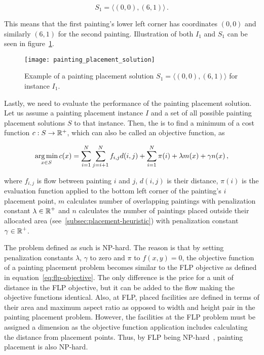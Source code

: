 \[
    S_1 = \langle (0,0), (6,1) \rangle \,.
\]

This means that the first painting's lower left corner has coordinates $(0,0)$
and similarly $(6,1)$ for the second painting.
Illustration of both $I_1$ and $S_1$ can be seen in figure~\ref{fig:painting-placement-solution}.

\begin{figure}
    \texttt{[image: painting\_placement\_solution]}
    \caption[Example of a painting placement solution]{Example of a painting placement solution $S_1 = \langle (0,0), (6,1) \rangle$ for instance $I_1$.}
    \label{fig:painting-placement-solution}
\end{figure}

\newpage

Lastly, we need to evaluate the performance of the painting placement solution.
Let us assume a painting placement instance $I$ and a set of all possible painting placement solutions $S$ to that instance.
Then, the  is to find a minimum of a cost function $c: S \to \operatorname*{\mathbb{R}^+}$,
which can also be called an objective function, as


\begin{equation}
    \operatorname*{arg\,min}_{x \in S} c(x) = \sum\limits_{i=1}^N\sum\limits_{j=i+1}^N f_{i,j}d(i, j) + \sum\limits_{i=1}^N \pi(i) + \lambda m(x) + \gamma n(x) \,,
    \label{eq:objective}
\end{equation}

where $f_{i,j}$ is flow between painting $i$ and $j$, $d(i,j)$ is their distance,
$\pi(i)$ is the evaluation function applied to the bottom left corner of the painting's $i$  placement point,
$m$ calculates number of overlapping paintings with penalization constant $\lambda \in \operatorname*{\mathbb{R}}^+$
and $n$ calculates the number of paintings placed outside their allocated area (see~\ref{subsec:placement-heuristic})
with penalization constant $\gamma \in \operatorname*{\mathbb{R}}^+$.

The problem defined as such is NP-hard.
The reason is that by setting penalization constants $\lambda$, $\gamma$ to zero and $\pi$ to $f(x,y) = 0$,
the objective function of a painting placement problem becomes similar to the FLP objective as defined in equation~\ref{eq:flp-objective}.
The only difference is the price for a unit of distance in the FLP objective, but it can be added to the flow making the objective functions identical.
Also, at FLP, placed facilities are defined in terms of their area and maximum aspect ratio as opposed to width and height pair in the painting placement problem.
However, the facilities at the FLP problem must be assigned a dimension as the objective function application includes calculating the distance from placement points.
Thus, by FLP being NP-hard~\cite{liuMultiobjectiveParticleSwarm2018, goncalvesBiasedRandomkeyGenetic2015, friedrichIntegratedSlicingTree2018}, painting placement is also NP-hard.

